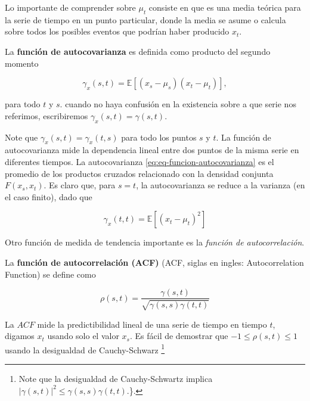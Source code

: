 \documentclass[12pt,]{krantz}
\theoremstyle{definition}
\theoremstyle{definition}
\theoremstyle{definition}
\theoremstyle{remark}
\let\BeginKnitrBlock\begin \let\EndKnitrBlock\end
\begin{document}
Lo importante de comprender sobre \(\mu_t\) consiste en que es una media
teórica para la serie de tiempo en un punto particular, donde la media
se asume o calcula sobre todos los posibles eventos que podrían haber
producido \(x_t\).

\BeginKnitrBlock{definition}
\protect\hypertarget{def:defi-funcion-autocovarianza}{}{\label{def:defi-funcion-autocovarianza}
}La \textbf{función de autocovarianza} es definida como producto del
segundo momento

\begin{equation}
\gamma_x(s,t)=\mathbb{E}[(x_s-\mu_s)(x_t-\mu_t)],
\label{eq:eq-funcion-autocovarianza}
\end{equation}

para todo \(t\) y \(s\). cuando no haya confusión en la existencia sobre
a que serie nos referimos, escribiremos \(\gamma_x(s,t)=\gamma(s,t)\).
\EndKnitrBlock{definition}

Note que \(\gamma_x(s,t)=\gamma_x(t,s)\) para todo los puntos \(s\) y
\(t\). La función de autocovarianza mide la dependencia lineal entre dos
puntos de la misma serie en diferentes tiempos. La autocovarianza
\eqref{eq:eq-funcion-autocovarianza} es el promedio de los productos
cruzados relacionado con la densidad conjunta \(F(x_s,x_t)\). Es claro
que, para \(s=t\), la autocovarianza se reduce a la varianza (en el caso
finito), dado que

\begin{equation}
\gamma_x(t,t)=\mathbb{E}[(x_t-\mu_t)^2]
\label{eq:eq-funcion-autocovarianza-varianza}
\end{equation}

Otro función de medida de tendencia importante es la \emph{función de
autocorrelación}.

\BeginKnitrBlock{definition}
\protect\hypertarget{def:defi-acf}{}{\label{def:defi-acf} }La
\textbf{función de autocorrelación (ACF)} (ACF, siglas en ingles:
Autocorrelation Function) se define como

\begin{equation}
\rho(s,t)=\frac{\gamma(s,t)}{\sqrt{\gamma(s,s)\gamma(t,t)}}
\label{eq:eq-funcion-autocorrelacion}
\end{equation}
\EndKnitrBlock{definition}

La \(ACF\) mide la predictibilidad lineal de una serie de tiempo en
tiempo \(t\), digamos \(x_t\) usando solo el valor \(x_s\). Es fácil de
demostrar que \(-1\leq\rho(s,t)\leq1\) usando la desigualdad de
Cauchy-Schwarz \footnote{Note que la desigualdad de Cauchy-Schwartz
  implica \(|\gamma(s,t)|^2\leq\gamma(s,s)\gamma(t,t)\).\}.}
\end{document}
